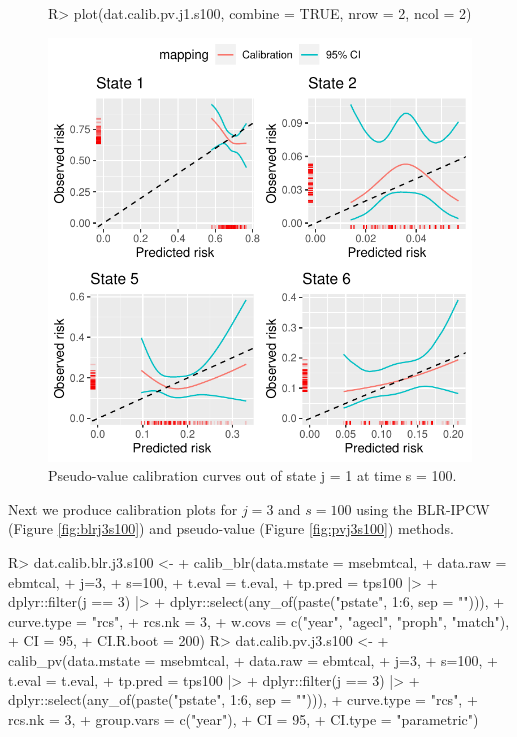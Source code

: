 \documentclass[article,shortnames]{jss}
\begin{document}
\begin{figure}
\centering
\begin{Schunk}
\begin{Sinput}
R> plot(dat.calib.pv.j1.s100, combine = TRUE, nrow = 2, ncol = 2)
\end{Sinput}
\end{Schunk}
\includegraphics{calibmsm-jss-TEST-013}
\caption{\label{fig:pvj1s100} Pseudo-value calibration curves out of state j =  1 at time s = 100.}
\end{figure}

Next we produce calibration plots for $j = 3$ and $s = 100$ using the BLR-IPCW (Figure \ref{fig:blrj3s100}) and pseudo-value (Figure \ref{fig:pvj3s100}) methods.

\begin{Schunk}
\begin{Sinput}
R> dat.calib.blr.j3.s100 <-
+    calib_blr(data.mstate = msebmtcal,
+                   data.raw = ebmtcal,
+                   j=3,
+                   s=100,
+                   t.eval = t.eval,
+                   tp.pred = tps100 |>
+                     dplyr::filter(j == 3) |>
+                     dplyr::select(any_of(paste("pstate", 1:6, sep = ""))),
+                   curve.type = "rcs",
+                   rcs.nk = 3,
+                   w.covs = c("year", "agecl", "proph", "match"),
+                   CI = 95,
+                   CI.R.boot = 200)
R> dat.calib.pv.j3.s100 <-
+    calib_pv(data.mstate = msebmtcal,
+                  data.raw = ebmtcal,
+                  j=3,
+                  s=100,
+                  t.eval = t.eval,
+                  tp.pred = tps100 |>
+                   dplyr::filter(j == 3) |>
+                   dplyr::select(any_of(paste("pstate", 1:6, sep = ""))),
+                  curve.type = "rcs",
+                  rcs.nk = 3,
+                  group.vars = c("year"),
+                  CI = 95,
+                  CI.type = "parametric")
\end{Sinput}
\end{Schunk}
\end{document}
